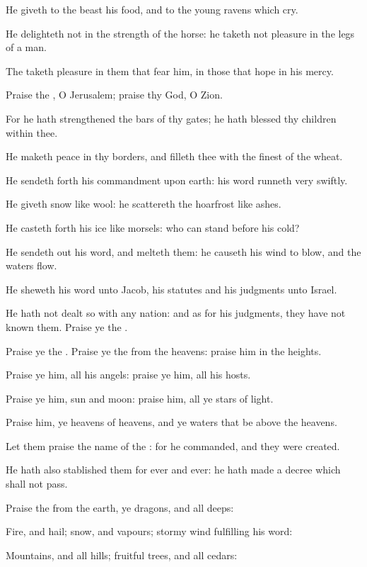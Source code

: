 \Verse He giveth to the beast his food, and to the young ravens which cry.

\Verse He delighteth not in the strength of the horse: he taketh not pleasure in the legs of a man.

\Verse The \LORD taketh pleasure in them that fear him, in those that hope in his mercy.

\Verse Praise the \LORD, O Jerusalem; praise thy God, O Zion.

\Verse For he hath strengthened the bars of thy gates; he hath blessed thy children within thee.

\Verse He maketh peace in thy borders, and filleth thee with the finest of the wheat.

\Verse He sendeth forth his commandment upon earth: his word runneth very swiftly.

\Verse He giveth snow like wool: he scattereth the hoarfrost like ashes.

\Verse He casteth forth his ice like morsels: who can stand before his cold?

\Verse He sendeth out his word, and melteth them: he causeth his wind to blow, and the waters flow.

\Verse He sheweth his word unto Jacob, his statutes and his judgments unto Israel.

\Verse He hath not dealt so with any nation: and as for his judgments, they have not known them. Praise ye the \LORD.




\Chapter
\Verse Praise ye the \LORD. Praise ye the \LORD from the heavens: praise him in the heights.

\Verse Praise ye him, all his angels: praise ye him, all his hosts.

\Verse Praise ye him, sun and moon: praise him, all ye stars of light.

\Verse Praise him, ye heavens of heavens, and ye waters that be above the heavens.

\Verse Let them praise the name of the \LORD: for he commanded, and they were created.

\Verse He hath also stablished them for ever and ever: he hath made a decree which shall not pass.

\Verse Praise the \LORD from the earth, ye dragons, and all deeps:

\Verse Fire, and hail; snow, and vapours; stormy wind fulfilling his word:

\Verse Mountains, and all hills; fruitful trees, and all cedars:

